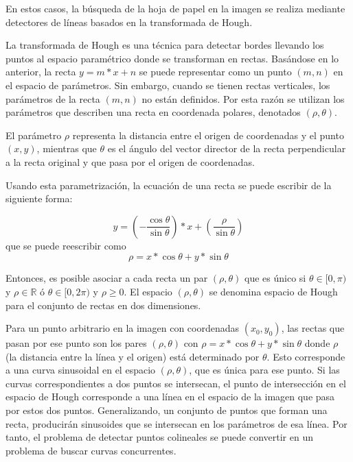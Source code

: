 En estos casos, la búsqueda de la hoja de papel en la imagen se realiza mediante detectores de líneas basados
en la transformada de Hough.

La transformada de Hough es una técnica para detectar bordes llevando los puntos al espacio
paramétrico donde se transforman en rectas.
Basándose en lo anterior, la recta $y = m*x+n$ se puede representar como un punto $(m,n)$ en el
espacio de parámetros. Sin embargo, cuando se tienen rectas
verticales, los parámetros de la recta $(m,n)$  no están definidos. Por esta razón se utilizan los parámetros
que describen una recta en coordenada polares, denotados $(\rho,\theta)$.

El parámetro $\rho$ representa la distancia entre el origen de coordenadas y el punto$(x,y)$,
mientras que $\theta$ es el ángulo del vector director de la recta perpendicular a la recta original
y que pasa por el origen de coordenadas.

Usando esta parametrización, la ecuación de una recta se puede escribir de la siguiente forma:

\begin{equation}
y=(-\dfrac{\cos \theta}{\sin \theta}) * x + (\dfrac{\rho}{\sin \theta})
\end{equation}
que se puede reescribir como
\begin{equation}
\rho=x * \cos \theta + y * \sin \theta
\end{equation}

Entonces, es posible asociar a cada recta un par $(\rho,\theta)$ que es único si $\theta \in
[0,\pi)$ y $\rho \in \mathbb{R}$ ó $\theta \in [0,2\pi)$ y $\rho \geq 0$. El espacio
$(\rho,\theta)$ se denomina espacio de Hough para el conjunto de rectas en dos dimensiones.

Para un punto arbitrario en la imagen con coordenadas $(x_0,y_0)$, las rectas que pasan por ese punto
son los pares  $(\rho,\theta)$ con  $\rho=x*\cos \theta + y * \sin \theta$ donde $\rho$ (la
distancia entre la línea y el origen) está determinado por $\theta$. Esto corresponde a una curva
sinusoidal en el espacio  $(\rho,\theta)$, que es única para ese punto. Si las curvas
correspondientes  a dos puntos se intersecan, el punto de intersección en el espacio de Hough
corresponde  a una línea en el espacio de la imagen que pasa por estos dos puntos. Generalizando, un
conjunto de puntos que forman una recta, producirán sinusoides que se intersecan en los parámetros
de esa línea. Por tanto, el problema de detectar puntos colineales se puede convertir en un problema
de buscar curvas concurrentes.

